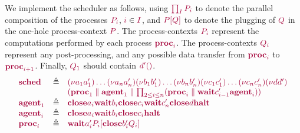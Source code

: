 \begin{example}
\begin{center}
  \end{center}

    We implement the scheduler as follows, using $\tm{\prod_{I}P_i}$ to denote the parallel composition of the processes $\tm{P_i}$, $\tm{i}\in\tm{I}$, and $\tm{\plug{P}{Q}}$ to denote the plugging of $\tm{Q}$ in the one-hole process-context $\tm{P}$. The process-contexts $\tm{P_i}$ represent the computations performed by each process $\tm{\proc{i}}$. The process-contexts $\tm{Q_i}$ represent any post-processing, and any possible data transfer from $\tm{\proc{i}}$ to $\tm{\proc{i+1}}$. Finally, $\tm{Q_1}$ should contain $\tm{\labwait{d'}}$.
\[
  \begin{array}{lrlr}
    \tm{\sched}
    & \defeq & \tm{\res{a_1}{a'_1}{\dots{\res{a_n}{a'_n}{}}}}
               \tm{\res{b_1}{b'_1}{\dots{\res{b_n}{b'_n}{}}}}
               \tm{\res{c_1}{c'_1}{\dots{\res{c_n}{c'_n}{}}}}
               \tm{\res{d}{d'}{}}
    \\ &     & \tm{(
               \ppar{\proc1}{\agent1}
               \parallel
               \prod_{2\leq{i}\leq{n}}(\ppar{\proc{i}}{\wait{c'_{i-1}}{\agent{i}}})
               )}
    \\
    \tm{\agent1}
    & \defeq & \tm{\close{a_i}{\wait{b_i}{\close{c_i}{\wait{c'_n}{\close{d}{\halt}}}}}}
    \\
    \tm{\agent{i}}
    & \defeq & \tm{\close{a_i}{\wait{b_i}{\close{c_i}{\halt}}}}
    \\
    \tm{\proc{i}}
    & \defeq & \tm{\wait{a'_i}{\plug{P_i}{\close{b'_i}{Q_i}}}}
  \end{array}
\]
\end{example}
\endgroup


